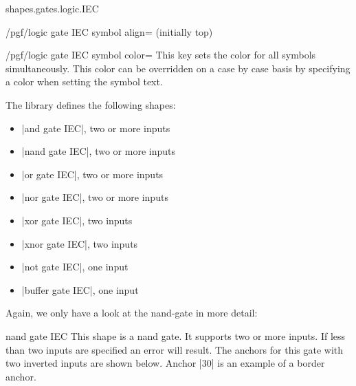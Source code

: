 \begin{pgflibrary}{shapes.gates.logic.IEC}
\begin{key}{/pgf/logic gate IEC symbol align= (initially top)}
\end{key}


\begin{key}{/pgf/logic gate IEC symbol color=}
  This key sets the color for all symbols simultaneously. This color
  can be overridden on a case by case basis by specifying a color
  when setting the symbol text.
\end{key}

  The library defines the following shapes:
  \begin{itemize}
  \item |and gate IEC|, two or more inputs
  \item |nand gate IEC|, two or more inputs
  \item |or gate IEC|, two or more inputs
  \item |nor gate IEC|, two or more inputs
  \item |xor gate IEC|, two inputs
  \item |xnor gate IEC|, two inputs
  \item |not gate IEC|, one input
  \item |buffer gate IEC|, one input
  \end{itemize}

  Again, we only have a look at the nand-gate in more detail:

\begin{shape}{nand gate IEC}
  This shape is a nand gate. It supports two or more inputs.
  If less than two inputs are specified an error will result.
	The anchors for this gate with two
  inverted inputs are
  shown below. Anchor |30| is an example of a border anchor.

\begin{codeexample}[]
\Huge
{}
\end{codeexample}
\end{shape}
\end{pgflibrary}




